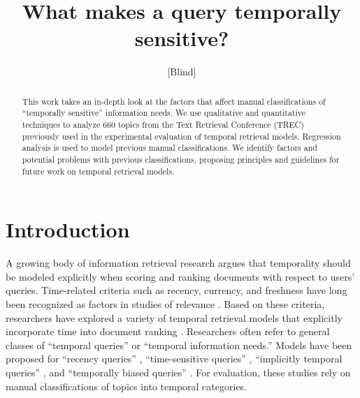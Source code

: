 \documentclass{sig-alternate}
\begin{document}

\author{[Blind]}

\title{What makes a query temporally sensitive?}

\maketitle

\begin{abstract}

This work takes an in-depth look at the factors that affect manual classifications of ``temporally sensitive'' information needs. We use qualitative and quantitative techniques to analyze 660 topics from the Text Retrieval Conference (TREC) previously used in the experimental evaluation of temporal retrieval models.  Regression analysis is used to model previous manual classifications. We identify factors and potential problems with previous classifications, proposing principles and guidelines for future work on temporal retrieval models.

\end{abstract}


\section{Introduction}

A growing body of information retrieval research argues that temporality should be modeled explicitly when scoring and ranking documents with respect to users' queries. Time-related criteria such as recency, currency, and freshness have long been recognized as factors in studies of relevance \cite{Barry1998}. Based on these criteria, researchers have explored a variety of temporal retrieval models that explicitly incorporate time into document ranking \cite{Li2003,Efron2011,Dakka2012}. Researchers often refer to general classes of ``temporal queries'' or ``temporal information needs.''  Models have been proposed for ``recency queries'' \cite{Li2003,Efron2011}, ``time-sensitive queries'' \cite{Dakka2012}, ``implicitly temporal queries'' \cite{Metzler2009}, and ``temporally biased queries'' \cite{Jones2007}.  For evaluation,  these studies rely on manual classifications of topics into temporal categories.
\end{document}
